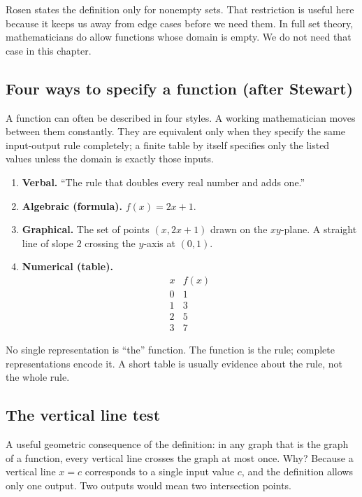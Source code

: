 Rosen states the definition only for nonempty sets. That restriction is useful here because it keeps us away from edge cases before we need them. In full set theory, mathematicians do allow functions whose domain is empty. We do not need that case in this chapter.

\subsection*{Four ways to specify a function (after Stewart)}

A function can often be described in four styles. A working mathematician moves between them constantly. They are equivalent only when they specify the same input-output rule completely; a finite table by itself specifies only the listed values unless the domain is exactly those inputs.

\begin{enumerate}
  \item \textbf{Verbal.} ``The rule that doubles every real number and adds one.''
  \item \textbf{Algebraic (formula).} $f(x) = 2x + 1$.
  \item \textbf{Graphical.} The set of points $(x, 2x + 1)$ drawn on the $xy$-plane. A straight line of slope $2$ crossing the $y$-axis at $(0, 1)$.
  \item \textbf{Numerical (table).}
    \[
      \begin{array}{c|c}
        x & f(x) \\ \hline
        0 & 1 \\ 1 & 3 \\ 2 & 5 \\ 3 & 7
      \end{array}
    \]
\end{enumerate}

No single representation is ``the'' function. The function is the rule; complete representations encode it. A short table is usually evidence about the rule, not the whole rule.

\subsection*{The vertical line test}

A useful geometric consequence of the definition: in any graph that is the graph of a function, every vertical line crosses the graph at most once. Why? Because a vertical line $x = c$ corresponds to a single input value $c$, and the definition allows only one output. Two outputs would mean two intersection points.

